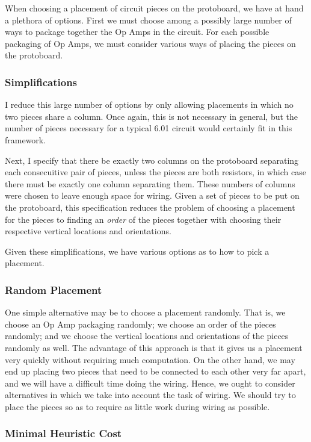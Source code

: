 When choosing a placement of circuit pieces on the protoboard, we have at hand a
plethora of options. First we must choose among a possibly large number of ways
to package together the Op Amps in the circuit. For each possible packaging of
Op Amps, we must consider various ways of placing the pieces on the protoboard.

\subsubsection{Simplifications}

I reduce this large number of options by only allowing placements in which no
two pieces share a column. Once again, this is not necessary in general, but the
number of pieces necessary for a typical 6.01 circuit would certainly fit in
this framework.

Next, I specify that there be exactly two columns on the protoboard separating
each consecuitive pair of pieces, unless the pieces are both resistors, in which
case there must be exactly one column separating them. These numbers of columns
were chosen to leave enough space for wiring. Given a set of pieces to be put on
the protoboard, this specification reduces the
problem of choosing a placement for the pieces to finding an \emph{order} of the
pieces together with choosing their respective vertical locations and
orientations.

Given these simplifications, we have various options as to how to pick a
placement.

\subsubsection{Random Placement}

One simple alternative may be to choose a placement randomly. That is, we choose
an Op Amp packaging randomly; we choose an order of the pieces randomly; and we
choose the vertical locations and orientations of the pieces randomly as well.
The advantage of this
approach is that it gives us a placement very quickly without requiring much
computation. On the other hand, we may end up placing two pieces that need to be
connected to each other very far apart, and we will have a difficult time doing
the wiring. Hence, we ought to consider alternatives in which we take into
account the task of wiring. We should try to place the pieces so as to require
as little work during wiring as possible.

\subsubsection{Minimal Heuristic Cost}

